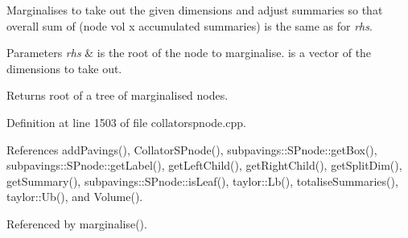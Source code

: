 \-Marginalises to take out the given dimensions and adjust summaries so that overall sum of (node vol x accumulated summaries) is the same as for {\itshape rhs\/}.


\begin{DoxyParams}{\-Parameters}
{\em rhs} & is the root of the node to marginalise.  is a vector of the dimensions to take out. \\
\hline
\end{DoxyParams}
\begin{DoxyReturn}{\-Returns}
root of a tree of marginalised nodes. 
\end{DoxyReturn}


\-Definition at line 1503 of file collatorspnode.\-cpp.



\-References add\-Pavings(), \-Collator\-S\-Pnode(), subpavings\-::\-S\-Pnode\-::get\-Box(), subpavings\-::\-S\-Pnode\-::get\-Label(), get\-Left\-Child(), get\-Right\-Child(), get\-Split\-Dim(), get\-Summary(), subpavings\-::\-S\-Pnode\-::is\-Leaf(), taylor\-::\-Lb(), totalise\-Summaries(), taylor\-::\-Ub(), and \-Volume().



\-Referenced by marginalise().


